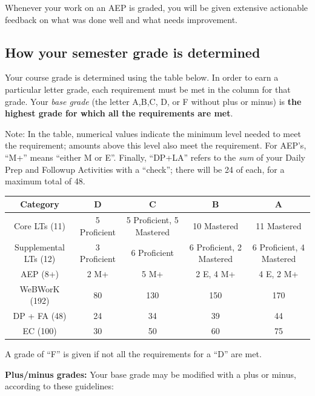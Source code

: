 \documentclass[]{article}
\begin{document}
Whenever your work on an AEP is graded, you will be given extensive
actionable feedback on what was done well and what needs improvement.

\hypertarget{how-your-semester-grade-is-determined}{%
\subsection{How your semester grade is
determined}\label{how-your-semester-grade-is-determined}}

Your course grade is determined using the table below. In order to earn
a particular letter grade, each requirement must be met in the column
for that grade. Your \emph{base grade} (the letter A,B,C, D, or F
without plus or minus) is \textbf{the highest grade for which all the
requirements are met}.

Note: In the table, numerical values indicate the minimum level needed
to meet the requirement; amounts above this level also meet the
requirement. For AEP's, ``M+'' means ``either M or E''. Finally,
``DP+LA'' refers to the \emph{sum} of your Daily Prep and Followup
Activities with a ``check''; there will be 24 of each, for a maximum
total of 48.


\begin{tabular}{c||c|c|c|c}
Category & D & C & B & A \\ \hline
Core LTs (11) & 5 Proficient & 5 Proficient, 5 Mastered & 10 Mastered & 11 Mastered \\ \hline
Supplemental LTs (12) & 3 Proficient & 6 Proficient & 6 Proficient, 2 Mastered & 6 Proficient, 4 Mastered \\ \hline
AEP (8+) & 2 M+ & 5 M+ & 2 E, 4 M+ & 4 E, 2 M+ \\ \hline
WeBWorK (192) & 80 & 130 & 150 & 170 \\ \hline
DP + FA (48) & 24 & 34 & 39 & 44 \\ \hline
EC (100) & 30 & 50 & 60 & 75 
\end{tabular}


A grade of ``F'' is given if not all the requirements for a ``D'' are
met.

\textbf{Plus/minus grades:} Your base grade may be modified with a plus
or minus, according to these guidelines:
\end{document}
